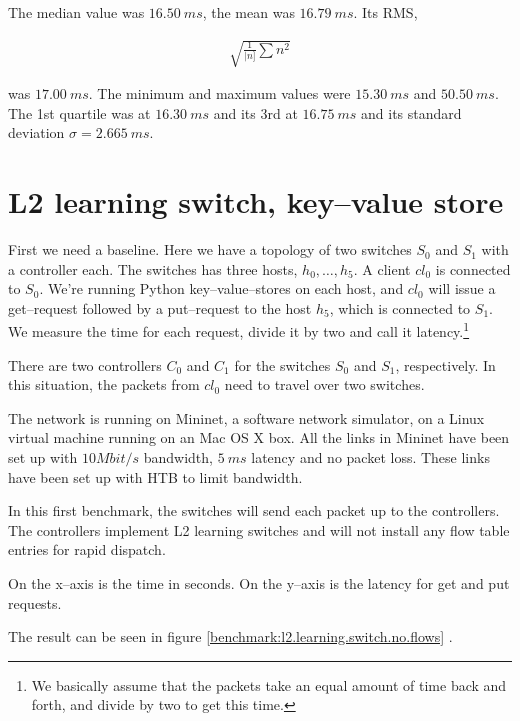 The median value was $16.50~ms$, the mean was $16.79~ms$.
Its \ac{RMS},

\begin{gather}
  \sqrt{\frac{1}{|n]}\sum{n^2}}
  \label{equation:rms}
\end{gather}

was $17.00~ms$.
The minimum and maximum values were $15.30~ms$ and $50.50~ms$.
The 1st quartile was at $16.30~ms$ and its 3rd at $16.75~ms$ and its standard
deviation $\sigma = 2.665~ms$.


\section{L2 learning switch, key--value store}
\label{chapter:benchmark.l2.kv.noflows}

First we need a baseline.  Here we have a topology of two switches $S_0$ and
$S_1$ with a controller each.  The switches has three hosts, $h_0, \dots, h_5$.
A client $cl_0$ is connected to $S_0$. We're running Python
key--value--stores on each host, and $cl_0$ will issue a get--request
followed by a put--request to the host $h_5$, which is connected to $S_1$.
We measure the time for each request, divide it
by two and call it latency.\footnote{We basically assume that the packets
take an equal amount of time back and forth, and divide by two to get this
time.}

There are two controllers $C_0$ and $C_1$ for the switches $S_0$ and $S_1$,
respectively.  In this situation, the packets from $cl_0$ need to travel
over two switches.

The network is running on Mininet, a software network simulator, on a Linux
virtual machine running on an Mac OS X box.  All the links in Mininet have
been set up with $10 Mbit/s$ bandwidth, $5~ms$ latency and no packet
loss.  These links have been set up with \ac{HTB} to limit bandwidth.

In this first benchmark, the switches will send each packet up to the
controllers.  The controllers implement L2 learning switches and will not
install any flow table entries for rapid dispatch.

On the x--axis is the time in seconds.  On the y--axis is the latency for
get and put requests.

The result can be seen in figure \ref{benchmark:l2.learning.switch.no.flows} 
.

